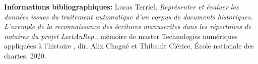 \bigskip
\bigskip
\bigskip

\textbf{Informations bibliographiques:} Lucas Terriel, \textit{Représenter et évaluer les données issues du traitement automatique d'un corpus de documents historiques. L'exemple de la reconnaissance des écritures manuscrites dans les répertoires de notaires du projet LectAuRep.}, mémoire de master \og Technologies numériques appliquées à l'histoire \fg{}, dir. Alix Chagué et Thibault Clérice, École nationale des chartes, 2020.

\clearpage
\thispagestyle{empty}
\cleardoublepage